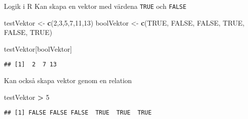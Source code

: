\documentclass[
  10pt,
  ignorenonframetext,
]{beamer}
\newenvironment{Shaded}{\begin{snugshade}}{\end{snugshade}}
\newcommand{\ConstantTok}[1]{\textcolor[rgb]{0.56,0.35,0.01}{#1}}
\newcommand{\DecValTok}[1]{\textcolor[rgb]{0.00,0.00,0.81}{#1}}
\newcommand{\FunctionTok}[1]{\textcolor[rgb]{0.13,0.29,0.53}{\textbf{#1}}}
\newcommand{\NormalTok}[1]{#1}
\newcommand{\OtherTok}[1]{\textcolor[rgb]{0.56,0.35,0.01}{#1}}
\newcommand{\SpecialCharTok}[1]{\textcolor[rgb]{0.81,0.36,0.00}{\textbf{#1}}}
\begin{document}
\begin{frame}[fragile]{Logik i R}
\protect\hypertarget{logik-i-r}{}
Kan skapa en vektor med värdena \texttt{TRUE} och \texttt{FALSE}

\begin{Shaded}
\begin{Highlighting}[]
\NormalTok{testVektor }\OtherTok{\textless{}{-}} \FunctionTok{c}\NormalTok{(}\DecValTok{2}\NormalTok{,}\DecValTok{3}\NormalTok{,}\DecValTok{5}\NormalTok{,}\DecValTok{7}\NormalTok{,}\DecValTok{11}\NormalTok{,}\DecValTok{13}\NormalTok{)}
\NormalTok{boolVektor }\OtherTok{\textless{}{-}} \FunctionTok{c}\NormalTok{(}\ConstantTok{TRUE}\NormalTok{, }\ConstantTok{FALSE}\NormalTok{, }\ConstantTok{FALSE}\NormalTok{, }\ConstantTok{TRUE}\NormalTok{, }\ConstantTok{FALSE}\NormalTok{, }\ConstantTok{TRUE}\NormalTok{)}
\end{Highlighting}
\end{Shaded}

\begin{Shaded}
\begin{Highlighting}[]
\NormalTok{testVektor[boolVektor]}
\end{Highlighting}
\end{Shaded}

\pause

\begin{verbatim}
## [1]  2  7 13
\end{verbatim}

\pause

Kan också skapa vektor genom en relation

\begin{Shaded}
\begin{Highlighting}[]
\NormalTok{testVektor }\SpecialCharTok{\textgreater{}} \DecValTok{5}
\end{Highlighting}
\end{Shaded}

\begin{verbatim}
## [1] FALSE FALSE FALSE  TRUE  TRUE  TRUE
\end{verbatim}
\end{frame}
\end{document}
